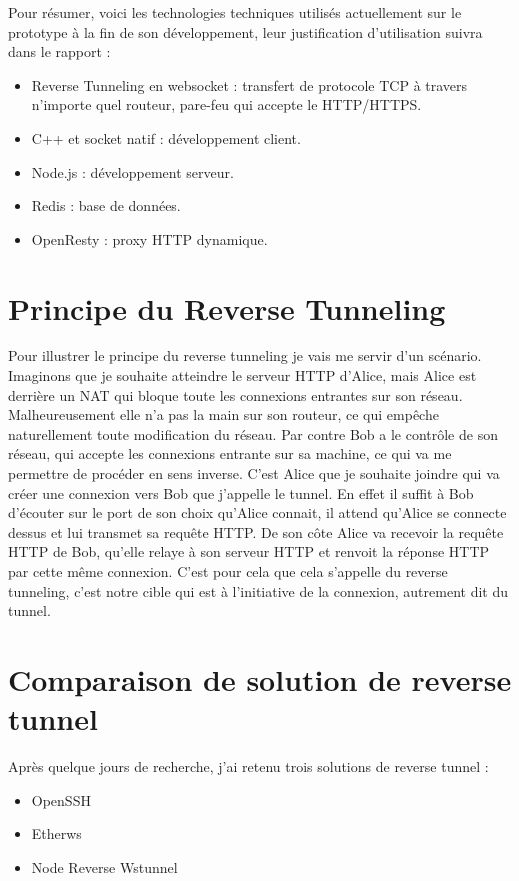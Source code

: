 Pour résumer, voici les technologies techniques utilisés actuellement sur le prototype à la fin de son développement, leur justification d'utilisation suivra dans le rapport :

\begin{itemize}
    \item Reverse Tunneling en websocket : transfert de protocole TCP à travers n'importe quel routeur, pare-feu qui accepte le HTTP/HTTPS.
    \item C++ et socket natif : développement client.
    \item Node.js : développement serveur.
    \item Redis : base de données.
    \item OpenResty : proxy HTTP dynamique.
\end{itemize}

\section{Principe du Reverse Tunneling}

Pour illustrer le principe du reverse tunneling je vais me servir d'un scénario. Imaginons que je souhaite atteindre le serveur HTTP d'Alice, mais Alice est derrière un NAT qui bloque toute les connexions entrantes sur son réseau. Malheureusement elle n'a pas la main sur son routeur, ce qui empêche naturellement toute modification du réseau. Par contre Bob a le contrôle de son réseau, qui accepte les connexions entrante sur sa machine, ce qui va me permettre de procéder en sens inverse. C'est Alice que je souhaite joindre qui va créer une connexion vers Bob que j'appelle le tunnel. En effet il suffit à Bob d'écouter sur le port de son choix qu'Alice connait, il attend qu'Alice se connecte dessus et lui transmet sa requête HTTP. De son côte Alice va recevoir la requête HTTP de Bob, qu'elle relaye à son serveur HTTP et renvoit la réponse HTTP par cette même connexion. C'est pour cela que cela s'appelle du reverse tunneling, c'est notre cible qui est à l'initiative de la connexion, autrement dit du tunnel.

\section{Comparaison de solution de reverse tunnel}

Après quelque jours de recherche, j'ai retenu trois solutions de reverse tunnel :

\begin{itemize}
    \item OpenSSH
    \item Etherws
    \item Node Reverse Wstunnel
\end{itemize}

